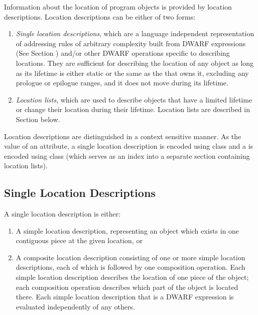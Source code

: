 Information about the location of program objects is provided
by location descriptions. Location descriptions can be either
of two forms:
\begin{enumerate}[1. ]
\item \textit{Single location descriptions},
which
are
a language independent representation of
addressing rules of arbitrary complexity built from
DWARF expressions (See Section )
and/or other
DWARF operations specific to describing locations. They are
sufficient for describing the location of any object as long
as its lifetime is either static or the same as the
 that owns it,
\bb
excluding any prologue or epilogue ranges,
\eb
and it does not move during its lifetime.


\item \textit{Location lists}, which are used to
describe
objects that have a limited lifetime or change their location
during their lifetime. Location lists are described in
Section  below.

\end{enumerate}

Location descriptions are distinguished in a context sensitive
manner. As the value of an attribute, a
\bb
single
\eb
location description is encoded using class
\bb
\CLASSlocdesc{}
\eb
and a  is encoded
using class \CLASSloclist{} (which serves as an
index into a separate section containing location lists).

\subsection{Single Location Descriptions}
\label{chap:singlelocationdescriptions}
A single location description is either:
\begin{enumerate}[1. ]
\item A simple location description, representing an object
which
exists in one contiguous piece at the given location, or
\item A composite location description consisting of one or more
simple location descriptions, each of which is followed by
one composition operation. Each simple location description
describes the location of one piece of the object; each
composition operation describes which part of the object is
located there. Each simple location description that is a
DWARF expression is evaluated independently of any others.
\end{enumerate}


